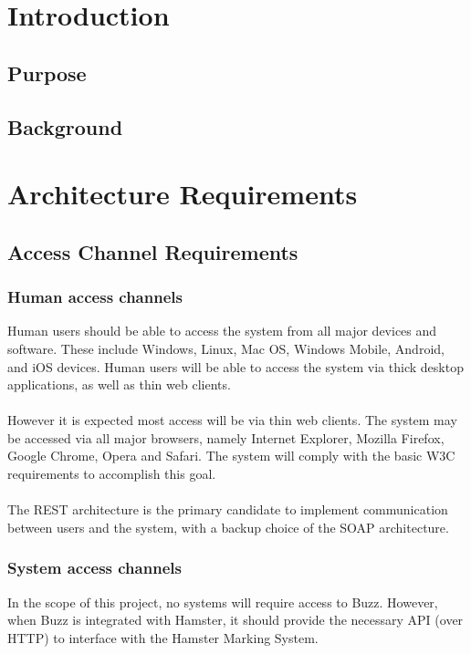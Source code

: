 \documentclass[12pt]{article}
\begin{document}
\newpage
\tableofcontents
\newpage

\section{Introduction}

\subsection{Purpose}

\subsection{Background}

\section{Architecture Requirements}
\subsection{Access Channel Requirements}

\subsubsection{Human access channels}
Human users should be able to access the system from all major devices and software. These include Windows, Linux, Mac OS, Windows Mobile, Android, and iOS devices. Human users will be able to access the system via thick desktop applications, as well as thin web clients. 
\\\\However it is expected most access will be via thin web clients.
The system may be accessed via all major browsers, namely Internet Explorer, Mozilla Firefox, Google Chrome, Opera and Safari. The system will comply with the basic W3C requirements to accomplish this goal.
\\\\The REST architecture is the primary candidate to implement communication between users and the system, with a backup choice of the SOAP architecture.

\subsubsection{System access channels}
In the scope of this project, no systems will require access to Buzz. However, when Buzz is integrated with Hamster, it should provide the necessary API (over HTTP) to interface with the Hamster Marking System.
\end{document}
